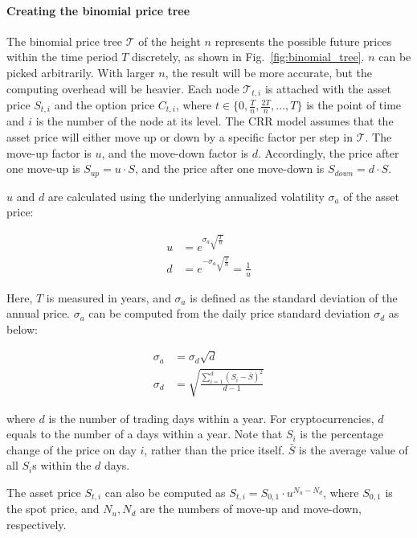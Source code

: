 \paragraph{Creating the binomial price tree}
The binomial price tree $\mathcal{T}$ of the height $n$ represents the possible future prices within the time period $T$ discretely, as shown in Fig.~\ref{fig:binomial_tree}.
$n$ can be picked arbitrarily. With larger $n$, the result will be more accurate, but the computing overhead will be heavier.
Each node $\mathcal{T}_{t, i}$ is attached with the asset price $S_{t, i}$ and the option price $C_{t, i}$,
where $t \in \{0, \frac{T}{n}, \frac{2T}{n}, \dots, T\}$ is the point of time and $i$ is the number of the node at its level.
The CRR model assumes that the asset price will either move up or down by a specific factor per step in $\mathcal{T}$.
The move-up factor is $u$, and the move-down factor is $d$.
Accordingly, the price after one move-up is $S_{up} = u \cdot S$, and the price after one move-down is $S_{down} = d \cdot S$.

$u$ and $d$ are calculated using the underlying annualized volatility $\sigma_a$ of the asset price:

\begin{align} 
u &= e^{\sigma_a \sqrt{\frac{T}{n}}}\\
d &= e^{- \sigma_a \sqrt{\frac{T}{n}}} = \frac{1}{u}
\end{align}

Here, $T$ is measured in years, and $\sigma_a$ is defined as the standard deviation of the annual price.
$\sigma_a$ can be computed from the daily price standard deviation $\sigma_d$ as below:

\begin{align} 
\sigma_a &= \sigma_d \sqrt{d}\\
\sigma_d &= \sqrt{\frac{\sum^{d}_{i=1} (S_i - \bar{S})^2}{d-1}}
\end{align}

where $d$ is the number of trading days within a year.
For cryptocurrencies, $d$ equals to the number of a days within a year.
Note that $S_i$ is the percentage change of the price on day $i$, rather than the price itself.
$\bar{S}$ is the average value of all $S_i$s within the $d$ days. 

The asset price $S_{t, i}$ can also be computed as $S_{t, i} = S_{0, 1} \cdot u^{N_u - N_d}$, where $S_{0, 1}$ is the spot price, and $N_u, N_d$ are the numbers of move-up and move-down, respectively.

